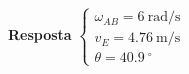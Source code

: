 \textbf{Resposta}
$
\begin{cases}
\omega_{AB}=\SI{6}{\radian/\second}\\
v_{E}=\SI{4.76}{\meter/\second}\\
\theta=\SI{40.9}{^{\circ}}
\end{cases}
$
